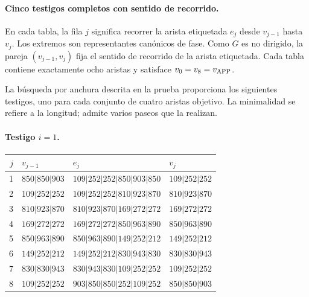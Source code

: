 \paragraph{Cinco testigos completos con sentido de recorrido.}
En cada tabla, la fila \(j\) significa recorrer la arista etiquetada
\(e_j\) desde \(v_{j-1}\) hasta \(v_j\). Los extremos son representantes
canónicos de fase. Como \(G\) es no dirigido, la pareja
\((v_{j-1},v_j)\) fija el sentido de recorrido de la arista etiquetada.
Cada tabla contiene exactamente ocho aristas y satisface
\(v_0=v_8=v_{\rm APP}\).

La búsqueda por anchura descrita en la prueba proporciona los siguientes
testigos, uno para cada conjunto de cuatro aristas objetivo. La
minimalidad se refiere a la longitud; admite varios paseos que la realizan.
\paragraph{Testigo \(i=1\).}
\begin{center}
\small
\begin{tabular}{rlll}
\hline
\(j\)&\(v_{j-1}\)&\(e_j\)&\(v_j\)\\
\hline
1&\(850|850|903\)&\(109|252|252|850|903|850\)&\(109|252|252\)\\
2&\(109|252|252\)&\(109|252|252|810|923|870\)&\(810|923|870\)\\
3&\(810|923|870\)&\(810|923|870|169|272|272\)&\(169|272|272\)\\
4&\(169|272|272\)&\(169|272|272|850|963|890\)&\(850|963|890\)\\
5&\(850|963|890\)&\(850|963|890|149|252|212\)&\(149|252|212\)\\
6&\(149|252|212\)&\(149|252|212|830|943|830\)&\(830|830|943\)\\
7&\(830|830|943\)&\(830|943|830|109|252|252\)&\(109|252|252\)\\
8&\(109|252|252\)&\(903|850|850|252|109|252\)&\(850|850|903\)\\
\hline
\end{tabular}
\end{center}

